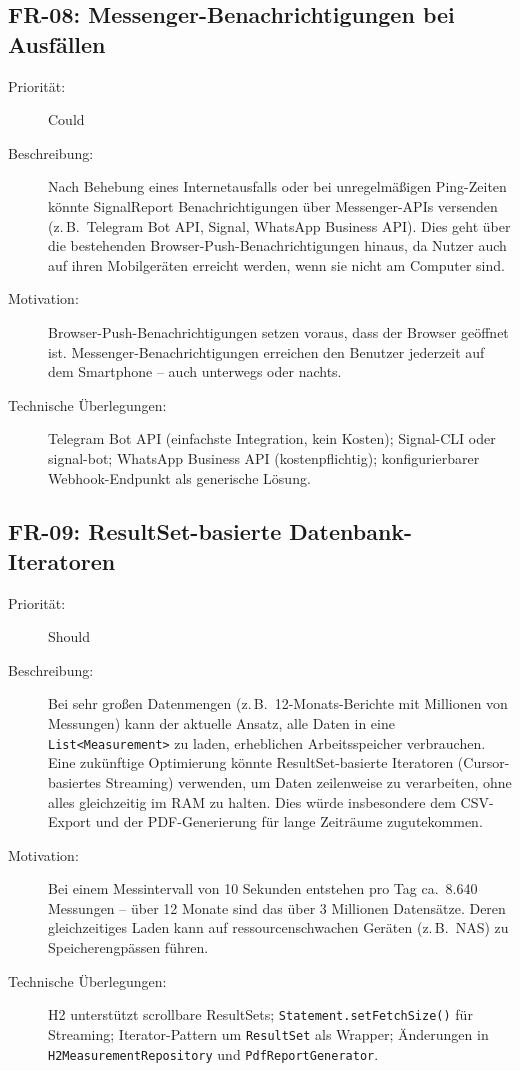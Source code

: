 \subsection{FR-08: Messenger-Benachrichtigungen bei Ausfällen}
\begin{description}
  \item[Priorität:] Could
  \item[Beschreibung:] Nach Behebung eines Internetausfalls oder bei unregelmäßigen
    Ping-Zeiten könnte SignalReport Benachrichtigungen über Messenger-APIs versenden
    (z.\,B.\ Telegram Bot API, Signal, WhatsApp Business API). Dies geht über die
    bestehenden Browser-Push-Benachrichtigungen hinaus, da Nutzer auch auf ihren
    Mobilgeräten erreicht werden, wenn sie nicht am Computer sind.
  \item[Motivation:] Browser-Push-Benachrichtigungen setzen voraus, dass der Browser
    geöffnet ist. Messenger-Benachrichtigungen erreichen den Benutzer jederzeit auf
    dem Smartphone -- auch unterwegs oder nachts.
  \item[Technische Überlegungen:] Telegram Bot API (einfachste Integration, kein
    Kosten); Signal-CLI oder signal-bot; WhatsApp Business API (kostenpflichtig);
    konfigurierbarer Webhook-Endpunkt als generische Lösung.
\end{description}

\subsection{FR-09: ResultSet-basierte Datenbank-Iteratoren}
\begin{description}
  \item[Priorität:] Should
  \item[Beschreibung:] Bei sehr großen Datenmengen (z.\,B.\ 12-Monats-Berichte mit
    Millionen von Messungen) kann der aktuelle Ansatz, alle Daten in eine
    \texttt{List<Measurement>} zu laden, erheblichen Arbeitsspeicher verbrauchen. Eine
    zukünftige Optimierung könnte ResultSet-basierte Iteratoren (Cursor-basiertes
    Streaming) verwenden, um Daten zeilenweise zu verarbeiten, ohne alles gleichzeitig
    im RAM zu halten. Dies würde insbesondere dem CSV-Export und der PDF-Generierung
    für lange Zeiträume zugutekommen.
  \item[Motivation:] Bei einem Messintervall von 10 Sekunden entstehen pro Tag ca.\
    8.640 Messungen -- über 12 Monate sind das über 3 Millionen Datensätze. Deren
    gleichzeitiges Laden kann auf ressourcenschwachen Geräten (z.\,B.\ NAS) zu
    Speicherengpässen führen.
  \item[Technische Überlegungen:] H2 unterstützt scrollbare ResultSets;
    \texttt{Statement.\allowbreak{}set\-Fetch\-Size()} für Streaming; Iterator-Pattern um
    \texttt{ResultSet} als Wrapper; Änderungen in \texttt{H2Measurement\-Repository}
    und \texttt{Pdf\-Report\-Generator}.
\end{description}

